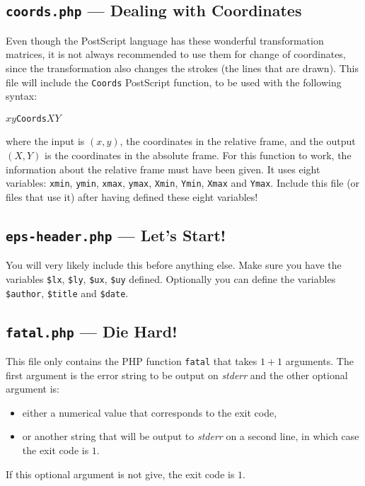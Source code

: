 \documentclass[10pt,a4paper]{scrartcl}
\newcommand\code[1]{\lstinline{#1}}
\newcommand\PS{PostScript}
\begin{document}
\subsection{\texttt{coords.php} --- Dealing with Coordinates}
\label{ssec:coords.php}
Even though the \PS{} language has these wonderful transformation matrices, it
is not always recommended to use them for change of coordinates, since the
transformation also changes the strokes (the lines that are drawn). This file
will include the \texttt{Coords} \PS{} function, to be used with the following
syntax:
\begin{center}
$x$\quad$y$\quad\texttt{Coords}\quad$X$\quad$Y$
\end{center}
where the input is $(x,y)$, the coordinates in the relative frame, and the output $(X,Y)$
is the coordinates in the absolute frame. For this function to work, the information about
the relative frame must have been given. It uses eight variables:
\texttt{xmin}, \texttt{ymin}, \texttt{xmax}, \texttt{ymax},
\texttt{Xmin}, \texttt{Ymin}, \texttt{Xmax} and \texttt{Ymax}.
Include this file (or files that use it) after having defined
these eight variables!

\subsection{\texttt{eps-header.php} --- Let's Start!}
\label{ssec:eps-header.php}
You will very likely include this before anything else. Make sure you have the variables
\code{$lx}, \code{$ly}, \code{$ux}, \code{$uy} defined. Optionally you can define the variables
\code{$author}, \code{$title} and \code{$date}.

\subsection{\texttt{fatal.php} --- Die Hard!}
\label{ssec:fatal.php}
This file only contains the PHP function \texttt{fatal} that takes $1+1$ arguments.
The first argument is the error string to be output on \textit{stderr} and the other
optional argument is:
\begin{itemize}
\item either a numerical value that corresponds to the exit code,
\item or another string that will be output to \textit{stderr} on a second line,
in which case the exit code is $1$.
\end{itemize}
If this optional argument is not give, the exit code is $1$.
\end{document}
